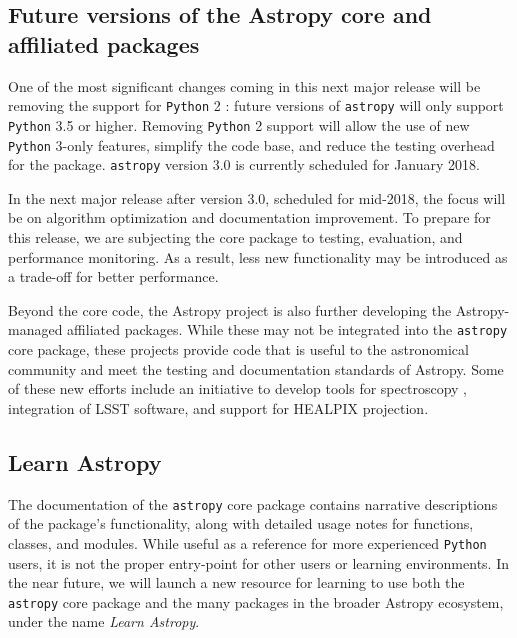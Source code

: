 \documentclass[modern]{aastex62}
\newcommand{\package}[1]{\texttt{#1}\xspace}
\newcommand{\python}{\package{Python}}
\newcommand{\astropy}{Astropy\xspace}
\newcommand{\astropypkg}{\package{astropy}}
\newcommand{\inlinecomment}[2]{\todo[inline]{#1: #2}\xspace}
\begin{document}
\subsection{Future versions of the Astropy core and affiliated packages}

One of the most significant changes coming in this next major release will be
removing the support for \python 2 \citep{ape10}: future versions of \astropypkg
will only support \python 3.5 or higher.
Removing \python 2 support will allow the use of new \python 3-only features,
simplify the code base, and reduce the testing overhead for the package.
\astropypkg version 3.0 is currently scheduled for January 2018.

In the next major release after version 3.0, scheduled for
mid-2018, the focus will be on algorithm optimization and
documentation improvement.
To prepare for this release, we are subjecting the core package to testing,
evaluation, and performance monitoring.
As a result, less new functionality may be introduced as a trade-off for
better performance.

Beyond the core code, the \astropy project is also further developing the
\astropy-managed affiliated packages.
While these may not be integrated into the \astropypkg core package, these
projects provide code that is useful to the astronomical community and meet the
testing and documentation standards of \astropy.
Some of these new efforts include an initiative to develop tools for
spectroscopy \citep[\package{specutils}, \package{specreduc}, \package{specviz}]
{ape13}, integration of LSST software, and support for HEALPIX
projection. %

\subsection{Learn Astropy}

The documentation of the \astropypkg core package contains narrative descriptions of
the package's functionality, along with detailed usage notes for functions,
classes, and modules.
While useful as a reference for more experienced \python users, it is not the
proper entry-point for other users or learning environments.
In the near future, we will launch a new resource for learning to use both the
\astropypkg core package and the many packages in the broader \astropy
ecosystem, under the name \emph{Learn Astropy}.
\end{document}
